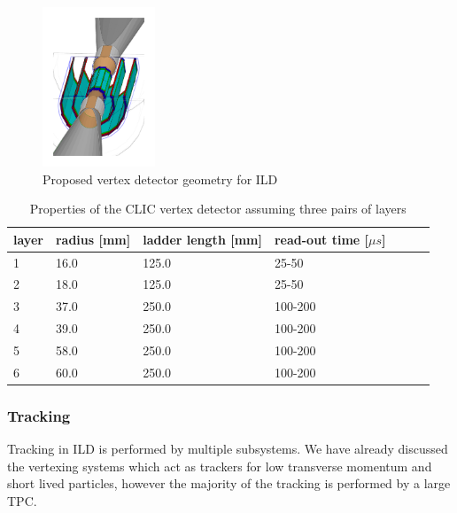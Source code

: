 \begin{figure}
  \centering
  \includegraphics[width=0.3\textwidth,keepaspectratio]{Experiments/fig/Vertex}
  \caption[ILD Vertex Detector]{Proposed vertex detector geometry for ILD \cite{ILD}}
  \label{fig:VTX}
\end{figure}

\begin{table}
  \label{tab:aVTX}
  \caption{Properties of the CLIC vertex detector assuming three pairs of layers \cite{ILD}}
  \centering

  \begin{tabular}{l l l l l l l}
    \toprule
    layer           & radius [mm]         & ladder length [mm]  & read-out time [$\mu s$]  \\
    \midrule
    1 & 16.0 & 125.0 & 25-50 \\
    2 & 18.0 & 125.0 & 25-50 \\
    3 & 37.0 & 250.0 & 100-200 \\
    4 & 39.0 & 250.0 & 100-200 \\
    5 & 58.0 & 250.0 & 100-200 \\
    6 & 60.0 & 250.0 & 100-200 \\
    \bottomrule
  \end{tabular}
\end{table}


\subsubsection{Tracking}

Tracking in \ac{ILD} is performed by multiple subsystems. We have already discussed the vertexing systems which act as trackers for low transverse momentum and short lived particles, however the majority of the tracking is performed by a large \ac{TPC}. 

